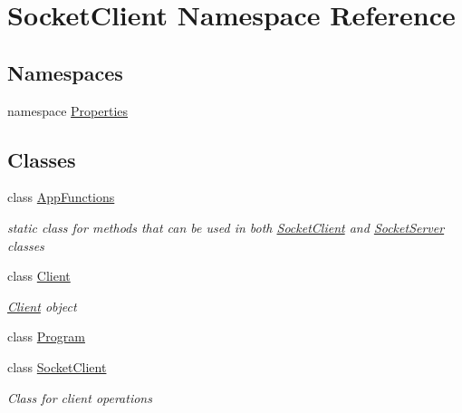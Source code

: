 \hypertarget{namespace_socket_client}{}\section{Socket\+Client Namespace Reference}
\label{namespace_socket_client}
\subsection*{Namespaces}
\begin{DoxyCompactItemize}
\item 
namespace \hyperlink{namespace_socket_client_1_1_properties}{Properties}
\end{DoxyCompactItemize}
\subsection*{Classes}
\begin{DoxyCompactItemize}
\item 
class \hyperlink{class_socket_client_1_1_app_functions}{App\+Functions}
\begin{DoxyCompactList}\small\item\em static class for methods that can be used in both \hyperlink{class_socket_client_1_1_socket_client}{Socket\+Client} and \hyperlink{namespace_socket_server}{Socket\+Server} classes \end{DoxyCompactList}\item 
class \hyperlink{class_socket_client_1_1_client}{Client}
\begin{DoxyCompactList}\small\item\em \hyperlink{class_socket_client_1_1_client}{Client} object \end{DoxyCompactList}\item 
class \hyperlink{class_socket_client_1_1_program}{Program}
\item 
class \hyperlink{class_socket_client_1_1_socket_client}{Socket\+Client}
\begin{DoxyCompactList}\small\item\em Class for client operations \end{DoxyCompactList}\end{DoxyCompactItemize}
